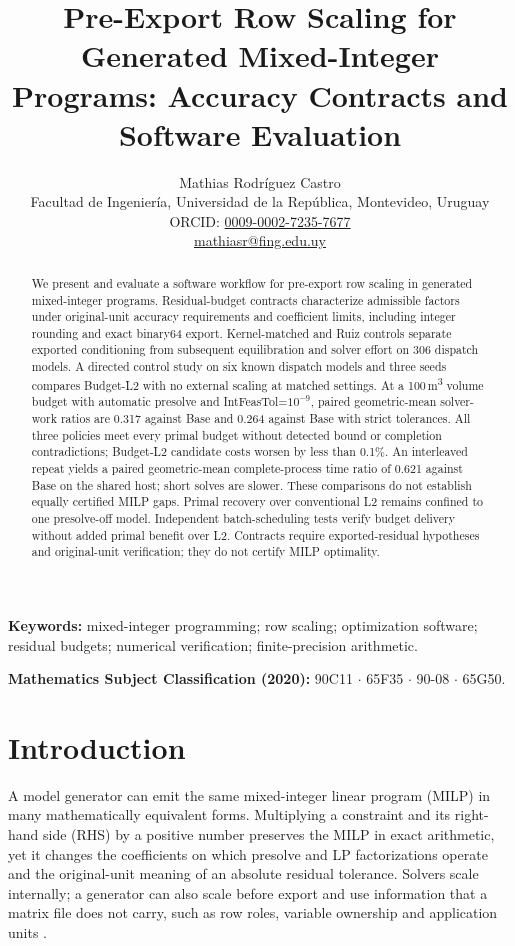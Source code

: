 \documentclass[11pt]{article}
\title{Pre-Export Row Scaling for Generated Mixed-Integer Programs: Accuracy Contracts and Software Evaluation}
\author{Mathias Rodr\'iguez Castro\\
\small Facultad de Ingenier\'ia, Universidad de la Rep\'ublica, Montevideo, Uruguay\\
\small ORCID: \href{https://orcid.org/0009-0002-7235-7677}{0009-0002-7235-7677}\\
\small\href{mailto:mathiasr@fing.edu.uy}{mathiasr@fing.edu.uy}}
\date{}
\theoremstyle{definition}
\theoremstyle{remark}
\begin{document}
\maketitle
\begin{abstract}
We present and evaluate a software workflow for pre-export row scaling in generated
mixed-integer programs. Residual-budget contracts characterize admissible factors
under original-unit accuracy requirements and coefficient limits, including integer
rounding and exact binary64 export. Kernel-matched and Ruiz controls separate exported conditioning from subsequent
equilibration and solver effort on 306 dispatch models.
A directed control study on six known dispatch models and three seeds compares
Budget-L2 with no external scaling at matched settings. At a 100\,m\textsuperscript{3}
volume budget with automatic presolve and IntFeasTol=$10^{-9}$, paired
geometric-mean solver-work ratios are 0.317 against Base and 0.264 against
Base with strict tolerances. All three policies meet every primal budget
without detected bound or completion contradictions; Budget-L2 candidate costs
worsen by less than 0.1\%. An interleaved repeat yields a paired geometric-mean
complete-process time ratio of 0.621 against Base on the shared host;
short solves are slower.
These comparisons do not establish equally certified
MILP gaps. Primal recovery over conventional L2 remains confined to one presolve-off
model. Independent batch-scheduling tests verify budget delivery without added
primal benefit over L2. Contracts require exported-residual hypotheses and
original-unit verification; they do not certify MILP optimality.
\end{abstract}
\noindent\textbf{Keywords:} mixed-integer programming; row scaling; optimization software;
residual budgets; numerical verification; finite-precision arithmetic.

\medskip
\noindent\textbf{Mathematics Subject Classification (2020):} 90C11 $\cdot$ 65F35 $\cdot$
90-08 $\cdot$ 65G50.
\linenumbers

\section{Introduction}
A model generator can emit the same mixed-integer linear program (MILP) in many mathematically
equivalent forms. Multiplying a constraint and its right-hand side (RHS) by a positive number
preserves the MILP in exact arithmetic, yet it changes the coefficients on which
presolve and LP factorizations operate and the original-unit meaning of an absolute residual
tolerance. Solvers scale internally; a generator can also scale before export and use
information that a matrix file does not carry, such as row roles, variable ownership and
application units \cite{gurobiExternalScaling,idaesScaling}.
\end{document}
